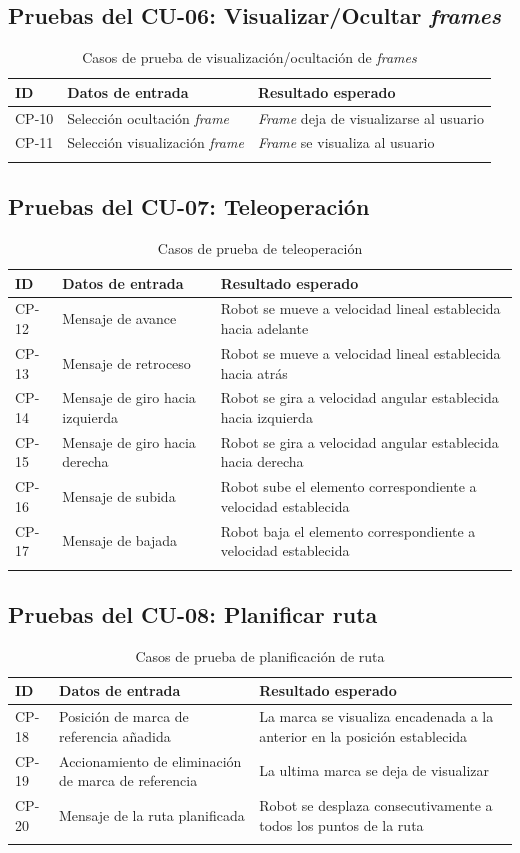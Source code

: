 \subsection{Pruebas del CU-06: Visualizar/Ocultar \textit{frames}}
\begin{longtable}{|p{1.5cm}|p{4cm}|p{4cm}|}
\hline
\textbf{ID} & \textbf{Datos de entrada} & \textbf{Resultado esperado} \\
\hline
CP-10 & Selección ocultación \textit{frame} & \textit{Frame} deja de visualizarse al usuario \\
\hline
CP-11 & Selección visualización \textit{frame} & \textit{Frame} se visualiza al usuario \\
\hline
\caption{Casos de prueba de visualización/ocultación de \textit{frames}}
\end{longtable}

\newpage
\subsection{Pruebas del CU-07: Teleoperación}
\begin{longtable}{|p{1.5cm}|p{4cm}|p{4cm}|}
\hline
\textbf{ID} & \textbf{Datos de entrada} & \textbf{Resultado esperado} \\
\hline
CP-12 & Mensaje de avance & Robot se mueve a velocidad lineal establecida hacia adelante \\
\hline
CP-13 & Mensaje de retroceso & Robot se mueve a velocidad lineal establecida hacia atrás \\
\hline
CP-14 & Mensaje de giro hacia izquierda & Robot se gira a velocidad angular establecida hacia izquierda \\
\hline
CP-15 & Mensaje de giro hacia derecha & Robot se gira a velocidad angular establecida hacia derecha \\
\hline
CP-16 & Mensaje de subida & Robot sube el elemento correspondiente a velocidad establecida \\
\hline
CP-17 & Mensaje de bajada & Robot baja el elemento correspondiente a velocidad establecida \\
\hline
\caption{Casos de prueba de teleoperación}
\end{longtable}

\newpage
\subsection{Pruebas del CU-08: Planificar ruta}
\begin{longtable}{|p{1.5cm}|p{4cm}|p{4cm}|}
\hline
\textbf{ID} & \textbf{Datos de entrada} & \textbf{Resultado esperado} \\
\hline
CP-18 & Posición de marca de referencia añadida & La marca se visualiza encadenada a la anterior en la posición establecida \\
\hline
CP-19 & Accionamiento de eliminación de marca de referencia & La ultima marca se deja de visualizar \\
\hline
CP-20 & Mensaje de la ruta planificada & Robot se desplaza consecutivamente a todos los puntos de la ruta \\
\hline
\caption{Casos de prueba de planificación de ruta}
\end{longtable}

